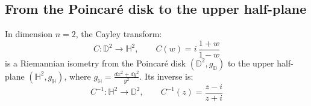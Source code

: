 \subsection{From the Poincaré disk to the upper half-plane}\label{subsec:isometria_poincare_semiplano}

\begin{theorem}\label{thm:isometria_poincare_semiplano}
In dimension $n = 2$, the Cayley transform:
\begin{equation}\label{eq:transformada_cayley}
C: \mathbb{D}^2 \to \mathbb{H}^2, \qquad C(w) = i\,\frac{1+w}{1-w}
\end{equation}
is a Riemannian isometry from the Poincaré disk $(\mathbb{D}^2, g_{\mathbb{D}})$ to the upper half-plane $(\mathbb{H}^2, g_{\mathbb{H}})$, where $g_{\mathbb{H}} = \frac{dx^2 + dy^2}{y^2}$. Its inverse is:
\begin{equation}\label{eq:cayley_inversa}
C^{-1}: \mathbb{H}^2 \to \mathbb{D}^2, \qquad C^{-1}(z) = \frac{z - i}{z + i}
\end{equation}
\end{theorem}

